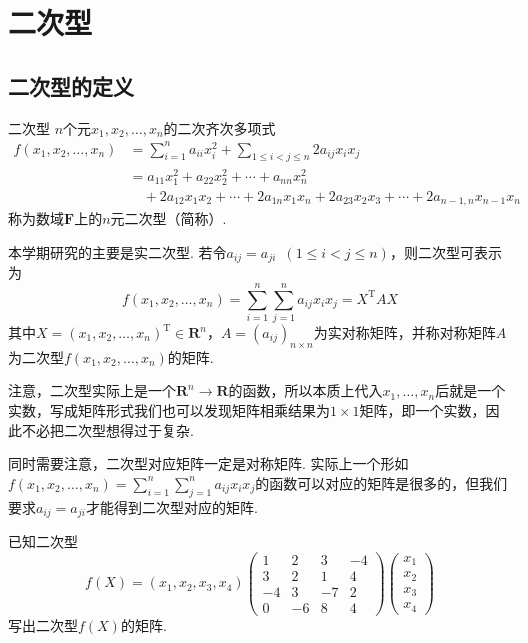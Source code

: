 \chapter{二次型}

\section{二次型的定义}

\begin{definition}{二次型}{} 
    $n$个元$x_1,x_2,\ldots,x_n$的二次齐次多项式
    \begin{align*}
        f(x_1,x_2,\ldots,x_n) & = \sum_{i=1}^{n}a_{ii}x_i^2+\sum\limits_{1\leqslant i<j\leqslant n}2a_{ij}x_ix_j    \\
                              & = a_{11}x_1^2+a_{22}x_2^2+\cdots+a_{nn}x_n^2                                        \\
                              & \quad +2a_{12}x_1x_2+\cdots+2a_{1n}x_1x_n+2a_{23}x_2x_3+\cdots+2a_{n-1,n}x_{n-1}x_n
    \end{align*}
    称为数域$\mathbf{F}$上的$n$元二次型（简称）.
\end{definition}
本学期研究的主要是实二次型. 若令$a_{ij}=a_{ji}\enspace(1\leqslant i<j\leqslant n)$，则二次型可表示为
\[f(x_1,x_2,\ldots,x_n)=\sum_{i=1}^{n}\sum_{j=1}^{n}a_{ij}x_ix_j=X^\mathrm{T}AX\]
其中$X=(x_1,x_2,\ldots,x_n)^\mathrm{T}\in\mathbf{R}^n$，$A=(a_{ij})_{n\times n}$为实对称矩阵，并称对称矩阵$A$为二次型$f(x_1,x_2,\ldots,x_n)$的矩阵.

注意，二次型实际上是一个$\mathbf{R}^n\to\mathbf{R}$的函数，所以本质上代入$x_1,\ldots,x_n$后就是一个实数，写成矩阵形式我们也可以发现矩阵相乘结果为$1\times 1$矩阵，即一个实数，因此不必把二次型想得过于复杂.

同时需要注意，二次型对应矩阵一定是对称矩阵. 实际上一个形如$f(x_1,x_2,\ldots,x_n)=\displaystyle\sum_{i=1}^{n}\sum_{j=1}^{n}a_{ij}x_ix_j$的函数可以对应的矩阵是很多的，但我们要求$a_{ij}=a_{ji}$才能得到二次型对应的矩阵.
\begin{example}{}{}
    已知二次型
    \[f(X)=(x_1,x_2,x_3,x_4)\begin{pmatrix}
            1 & 2 & 3 & -4 \\ 3 & 2 & 1 & 4 \\ -4 & 3 & -7 & 2 \\ 0 & -6 & 8 & 4
        \end{pmatrix}\begin{pmatrix}
            x_1 \\ x_2 \\ x_3 \\ x_4
        \end{pmatrix}\]
    写出二次型$f(X)$的矩阵.
\end{example}

